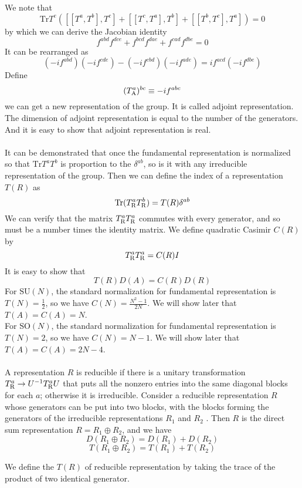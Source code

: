 \noindent
We note that
\[\mathrm{Tr} T^e\left([[T^a,T^b],T^c] + [[T^c,T^a],T^b] + [[T^b,T^c],T^a] \right) = 0\]
by which we can derive the Jacobian identity
\[f^{abd}f^{dce} + f^{bcd}f^{dae} + f^{cad}f^{dbe} = 0\]
It can be rearranged as 
\[(-if^{abd})(-if^{cde})-(-if^{cbd})(-if^{ade}) = if^{acd} (-if^{dbe})\]
Define
\[(T^a_{\rm A})^{bc} \equiv -if^{abc}\]
we can get a new representation of the group. It is called adjoint representation. The dimension of adjoint representation is equal to the number of the generators. And it is easy to show that adjoint representation is real.
\\ \\
It can be demonstrated that once the fundamental representation is normalized so that $\mathrm{Tr}T^aT^b$ is proportion to the $\delta^{ab}$, so is it with any irreducible representation of the group. Then we can define the index of a representation $T(R)$ as
\[\mathrm{Tr}(T^a_{\rm R} T^b_{\rm R}) = T(R)\delta^{ab}\]
We can verify that the matrix $T^a_{\rm R} T^a_{\rm R}$ commutes with
every generator, and so must be a number times the identity matrix. We define quadratic Casimir $C(R)$ by
\[T^a_{\rm R} T^a_{\rm R} = C(R)I\]
It is easy to show that
\[T(R)D(A) = C(R)D(R)\]
For $\mathrm{SU}(N)$, the standard normalization for fundamental representation is $T(N) = \frac{1}{2}$, so we have $C(N) = \frac{N^2-1}{2N}$. We will show later that $T(A) = C(A) = N$. \\
For $\mathrm{SO}(N)$, the standard normalization for fundamental representation is $T(N) = 2$, so we have $C(N) = N-1$. We will show later that $T(A) = C(A) = 2N-4$.
\\ \\
A representation $R$ is reducible if there is a unitary transformation $T^a_{\rm R} \to U^{-1}T^a_{\rm R}U$ that puts all the nonzero entries into the same diagonal blocks
for each $a$; otherwise it is irreducible. 
Consider a reducible representation $R$ whose generators can be put into two blocks, with the blocks forming the generators of the irreducible representations $R_1$ and $R_2$ . Then $R$ is the direct sum representation $R = R_1\oplus R_2$, and we have
\[D(R_1\oplus R_2) = D(R_1) + D(R_2)\]
\[T(R_1\oplus R_2) = T(R_1) + T(R_2)\]
\begin{note}
We define the $T(R)$ of reducible representation by taking the trace of the product of two identical generator.
\end{note}

